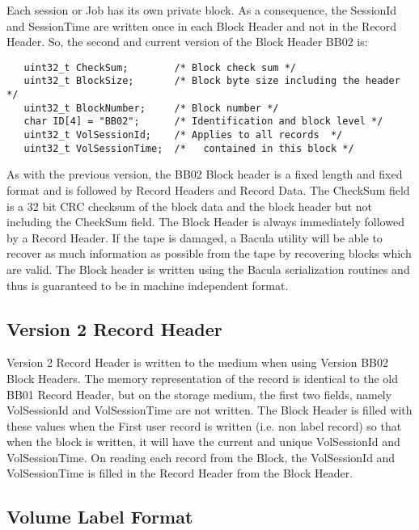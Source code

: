 Each session or Job has its own private block. As a consequence, the SessionId
and SessionTime are written once in each Block Header and not in the Record
Header. So, the second and current version of the Block Header BB02 is: 

\footnotesize
\begin{verbatim}
   uint32_t CheckSum;        /* Block check sum */
   uint32_t BlockSize;       /* Block byte size including the header */
   uint32_t BlockNumber;     /* Block number */
   char ID[4] = "BB02";      /* Identification and block level */
   uint32_t VolSessionId;    /* Applies to all records  */
   uint32_t VolSessionTime;  /*   contained in this block */
\end{verbatim}
\normalsize

As with the previous version, the BB02 Block header is a fixed length and
fixed format and is followed by Record Headers and Record Data. The CheckSum
field is a 32 bit CRC checksum of the block data and the block header but not
including the CheckSum field. The Block Header is always immediately followed
by a Record Header. If the tape is damaged, a Bacula utility will be able to
recover as much information as possible from the tape by recovering blocks
which are valid. The Block header is written using the Bacula serialization
routines and thus is guaranteed to be in machine independent format. 

\subsection*{Version 2 Record Header}

Version 2 Record Header is written to the medium when using Version BB02 Block
Headers. The memory representation of the record is identical to the old BB01
Record Header, but on the storage medium, the first two fields, namely
VolSessionId and VolSessionTime are not written. The Block Header is filled
with these values when the First user record is written (i.e. non label
record) so that when the block is written, it will have the current and unique
VolSessionId and VolSessionTime. On reading each record from the Block, the
VolSessionId and VolSessionTime is filled in the Record Header from the Block
Header. 

\subsection*{Volume Label Format}

